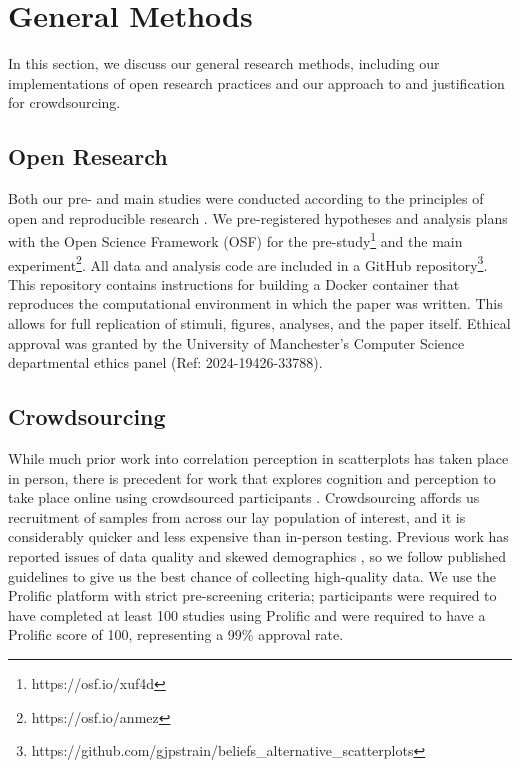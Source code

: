 \documentclass[sigconf]{acmart}
\begin{document}
\section{General Methods}\label{sec-general-methods}

In this section, we discuss our general research methods, including our
implementations of open research practices and our approach to and
justification for crowdsourcing.

\subsection{Open Research}\label{sec-open-research}

Both our pre- and main studies were conducted according to the
principles of open and reproducible research \citep{ayris_2018}. We
pre-registered hypotheses and analysis plans with the Open Science
Framework (OSF) for the pre-study\footnote{https://osf.io/xuf4d} and the
main experiment\footnote{https://osf.io/anmez}. All data and analysis
code are included in a GitHub repository\footnote{https://github.com/gjpstrain/beliefs\_alternative\_scatterplots}.
This repository contains instructions for building a Docker container
\citep{merkel_2014} that reproduces the computational environment in
which the paper was written. This allows for full replication of
stimuli, figures, analyses, and the paper itself. Ethical approval was
granted by the University of Manchester's Computer Science departmental
ethics panel (Ref: 2024-19426-33788).

\subsection{Crowdsourcing}\label{sec-crowdsourcing}

While much prior work into correlation perception in scatterplots has
taken place in person, there is precedent for work that explores
cognition and perception to take place online using crowdsourced
participants \citep{xiong_2022}. Crowdsourcing affords us recruitment of
samples from across our lay population of interest, and it is
considerably quicker and less expensive than in-person testing. Previous
work has reported issues of data quality and skewed demographics
\citep{chmielewski_2020, charalambides_2021, peer_2021}, so we follow
published guidelines \citep{peer_2021} to give us the best chance of
collecting high-quality data. We use the Prolific platform
\citep{prolific} with strict pre-screening criteria; participants were
required to have completed at least 100 studies using Prolific and were
required to have a Prolific score of 100, representing a 99\% approval
rate.
\end{document}
